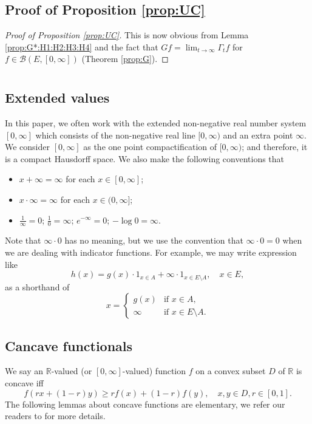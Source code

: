 \documentclass[12pt,a4paper]{amsart}
\numberwithin{equation}{section}
\theoremstyle{plain}
\theoremstyle{definition}
\theoremstyle{remark}
\begin{document}
\subsection{Proof of Proposition \ref{prop:UC}} \label{sec:UC}
\begin{proof}[Proof of Proposition \ref{prop:UC}]
	This is now obvious from Lemma \ref{prop:G*:H1:H2:H3:H4} and the fact that $Gf = \lim_{t\to \infty} \Gamma_t f$ for $f\in \mathcal B(E,[0,\infty])$ (Theorem \ref{prop:G}).
\end{proof}

\appendix\section{}
\subsection{Extended values} \label{sec:EV}
	In this paper, we often work with the extended non-negative real number system $[0,\infty]$ which consists of the non-negative real line $[0,\infty)$ and an extra point $\infty$.
	We consider $[0,\infty]$ as the one point compactification of $[0,\infty)$; and therefore, it is a compact Hausdorff space.
	We also make the following conventions that
\begin{itemize}
\item
	$x + \infty = \infty$ for each $x\in [0,\infty]$;
\item
	$x \cdot \infty = \infty$ for each $x\in (0,\infty]$;
\item
	$\frac{1}{\infty} = 0$; $\frac{1}{0} = \infty$; $e^{-\infty} =0$; $-\log 0 = \infty$.
\end{itemize}
	Note that $ \infty \cdot 0$ has no meaning, but we use the convention that $\infty \cdot 0 = 0$ when we are dealing with indicator functions.
	For example, we may write expression like
\begin{equation}
	h(x)
	= g(x) \cdot  1_{x\in A} + \infty \cdot 1_{x \in E\setminus A}, \quad x\in E,
\end{equation}
	as a shorthand of
\begin{equation}
	x =
\begin{cases}
	g(x) & \text{if $x\in A$},
	\\ \infty & \text{if $x\in E\setminus A$}.
\end{cases}
\end{equation}

\subsection{Cancave functionals}
	We say an $\mathbb R$-valued (or $[0,\infty]$-valued) function $f$ on a convex subset $D$ of $\mathbb R$ is concave iff
\[
   	f(rx+(1-r) y)
 	\geq r f(x) + (1-r) f(y),
 	\quad x,y \in D, r \in [0,1].
\]
	The following lemmas about concave functions are elementary, we refer our readers to \cite[Chapter 6]{Dudley2002Real} for more details.
\end{document}
